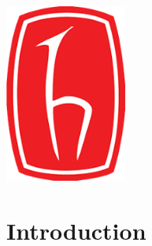 \documentclass[12pt]{article}
\begin{document}
\begin{titlepage}




\includegraphics[width=0.3\textwidth]{logo.png} %
 

\vfill %

\end{titlepage}


\section{Introduction}
\end{document}
